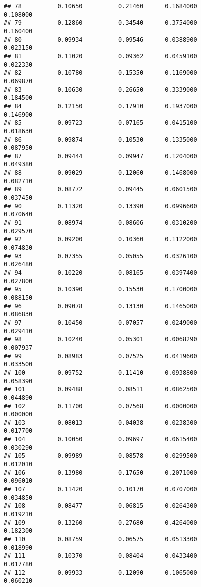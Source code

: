 \documentclass[
]{article}
\begin{document}
\begin{verbatim}
## 78          0.10650          0.21460      0.1684000            0.108000
## 79          0.12860          0.34540      0.3754000            0.160400
## 80          0.09934          0.09546      0.0388900            0.023150
## 81          0.11020          0.09362      0.0459100            0.022330
## 82          0.10780          0.15350      0.1169000            0.069870
## 83          0.10630          0.26650      0.3339000            0.184500
## 84          0.12150          0.17910      0.1937000            0.146900
## 85          0.09723          0.07165      0.0415100            0.018630
## 86          0.09874          0.10530      0.1335000            0.087950
## 87          0.09444          0.09947      0.1204000            0.049380
## 88          0.09029          0.12060      0.1468000            0.082710
## 89          0.08772          0.09445      0.0601500            0.037450
## 90          0.11320          0.13390      0.0996600            0.070640
## 91          0.08974          0.08606      0.0310200            0.029570
## 92          0.09200          0.10360      0.1122000            0.074830
## 93          0.07355          0.05055      0.0326100            0.026480
## 94          0.10220          0.08165      0.0397400            0.027800
## 95          0.10390          0.15530      0.1700000            0.088150
## 96          0.09078          0.13130      0.1465000            0.086830
## 97          0.10450          0.07057      0.0249000            0.029410
## 98          0.10240          0.05301      0.0068290            0.007937
## 99          0.08983          0.07525      0.0419600            0.033500
## 100         0.09752          0.11410      0.0938800            0.058390
## 101         0.09488          0.08511      0.0862500            0.044890
## 102         0.11700          0.07568      0.0000000            0.000000
## 103         0.08013          0.04038      0.0238300            0.017700
## 104         0.10050          0.09697      0.0615400            0.030290
## 105         0.09989          0.08578      0.0299500            0.012010
## 106         0.13980          0.17650      0.2071000            0.096010
## 107         0.11420          0.10170      0.0707000            0.034850
## 108         0.08477          0.06815      0.0264300            0.019210
## 109         0.13260          0.27680      0.4264000            0.182300
## 110         0.08759          0.06575      0.0513300            0.018990
## 111         0.10370          0.08404      0.0433400            0.017780
## 112         0.09933          0.12090      0.1065000            0.060210

\end{verbatim}
\end{document}
